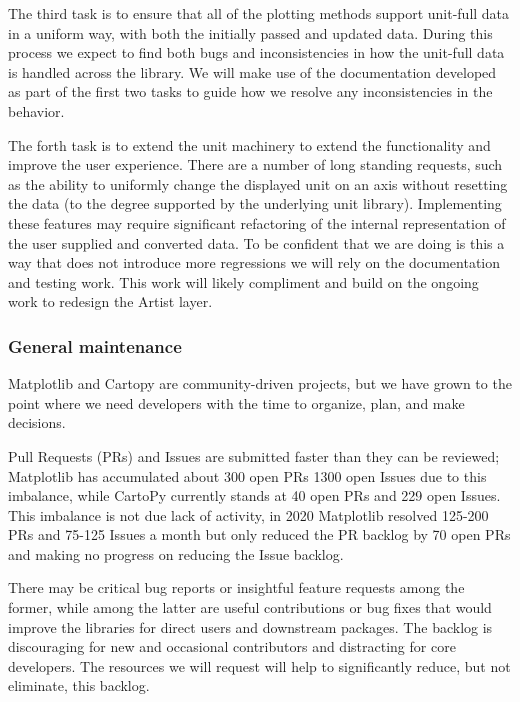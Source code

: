 \documentclass[12pt]{article}
\numberwithin{page}{section}
\begin{document}
The third task is to ensure that all of the plotting methods support
unit-full data in a uniform way, with both the initially passed and
updated data.  During this process we expect to find both bugs and
inconsistencies in how the unit-full data is handled across the
library.  We will make use of the documentation developed as part of
the first two tasks to guide how we resolve any inconsistencies in the
behavior.

The forth task is to extend the unit machinery to extend the
functionality and improve the user experience.  There are a number of
long standing requests, such as the ability to uniformly change the
displayed unit on an axis without resetting the data (to the degree
supported by the underlying unit library).  Implementing these
features may require significant refactoring of the internal
representation of the user supplied and converted data.  To be
confident that we are doing is this a way that does not introduce more
regressions we will rely on the documentation and testing work.  This
work will likely compliment and build on the ongoing work to redesign
the Artist layer.


\subsubsection{General maintenance}

Matplotlib and Cartopy are community-driven projects, but we have
grown to the point where we need developers with the time to organize,
plan, and make decisions.

Pull Requests (PRs) and Issues are submitted faster than they can be
reviewed; Matplotlib has accumulated about 300 open PRs 1300 open
Issues due to this imbalance, while CartoPy currently stands at 40
open PRs and 229 open Issues.  This imbalance is not due lack of
activity, in 2020 Matplotlib resolved 125-200 PRs and 75-125 Issues a
month but only reduced the PR backlog by 70 open PRs and making no progress
on reducing the Issue backlog.

There may be critical bug reports or insightful feature requests among
the former, while among the latter are useful contributions or bug
fixes that would improve the libraries for direct users and downstream
packages.  The backlog is discouraging for new and occasional
contributors and distracting for core developers. The resources we
will request will help to significantly reduce, but not eliminate,
this backlog.
\end{document}
